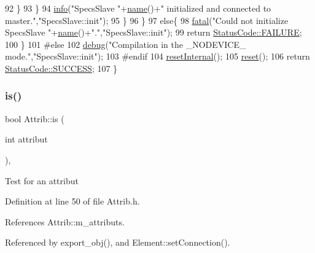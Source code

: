 \begin{DoxyCode}
92         \}
93       \}
94       \hyperlink{classObject_a644fd329ea4cb85f54fa6846484b84a8}{info}(\textcolor{stringliteral}{"SpecsSlave "}+\hyperlink{classObject_a300f4c05dd468c7bb8b3c968868443c1}{name}()+\textcolor{stringliteral}{" initialized and connected to master."},\textcolor{stringliteral}{"SpecsSlave::init"});
95     \}
96   \}
97   \textcolor{keywordflow}{else}\{
98     \hyperlink{classObject_aad5a16aac7516ce65bd5ec02ab07fc80}{fatal}(\textcolor{stringliteral}{"Could not initialize SpecsSlave "}+\hyperlink{classObject_a300f4c05dd468c7bb8b3c968868443c1}{name}()+\textcolor{stringliteral}{"."},\textcolor{stringliteral}{"SpecsSlave::init"});
99     \textcolor{keywordflow}{return} \hyperlink{classStatusCode_a6f565cbeadc76d14c72f047e5e85eb4ba3da73d4c469762eb9d3c960368252b26}{StatusCode::FAILURE}; 
100   \}
101 \textcolor{preprocessor}{#else
}
102   \hyperlink{classObject_aac010553f022165573714b7014a15f0d}{debug}(\textcolor{stringliteral}{"Compilation in the \_NODEVICE\_ mode."},\textcolor{stringliteral}{"SpecsSlave::init"});
103 \textcolor{preprocessor}{#endif
}
104   \hyperlink{classSpecsSlave_aa4f2493eabe522bb6651abcd67a6a690}{resetInternal}();
105   \hyperlink{classSpecsSlave_a6c69baff5941cabed2947f547041bbeb}{reset}();
106   \textcolor{keywordflow}{return} \hyperlink{classStatusCode_a6f565cbeadc76d14c72f047e5e85eb4badd0da38d3ba0d922efd1f4619bc37ad8}{StatusCode::SUCCESS};
107 \}
\end{DoxyCode}
\mbox{\label{classAttrib_a704f26af560909ad22065083bb7d4c34}} 
\subsubsection{\texorpdfstring{is()}{is()}}
{\footnotesize\ttfamily bool Attrib\+::is (\begin{DoxyParamCaption}\item[{int}]{attribut }\end{DoxyParamCaption})\hspace{0.3cm}{\ttfamily [inline]}, {\ttfamily [inherited]}}

Test for an attribut 

Definition at line 50 of file Attrib.\+h.



References Attrib\+::m\+\_\+attributs.



Referenced by export\+\_\+obj(), and Element\+::set\+Connection().



